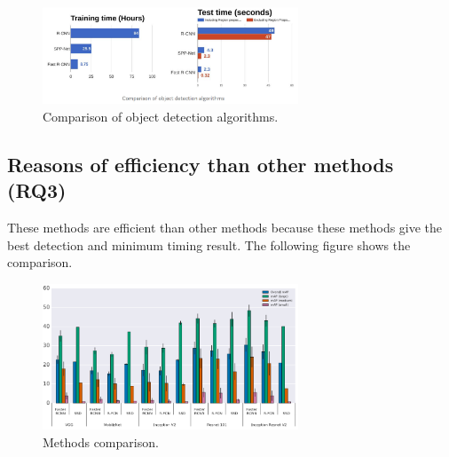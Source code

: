 \documentclass[two column]{ieeeaccess}
\begin{document}
\begin{figure}[h]
    \centering
    \includegraphics[width=3in]{q12.PNG}
    \caption{Comparison of object detection algorithms.}
    \label{fig14}
\end{figure}

\subsection{Reasons of efficiency than other methods (RQ3)}
These methods are efficient than other methods because these methods give the best detection and minimum timing result. The following figure shows the comparison.

\begin{figure}[h]
    \centering
    \includegraphics[width=3in]{q3.PNG}
    \caption{Methods comparison.}
    \label{fig15}
\end{figure}
\end{document}
